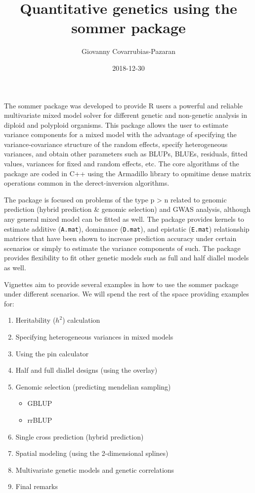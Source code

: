 \documentclass[]{article}
\title{Quantitative genetics using the sommer package}
\author{Giovanny Covarrubias-Pazaran}
\date{2018-12-30}
\providecommand{\tightlist}{%
  \setlength{\itemsep}{0pt}\setlength{\parskip}{0pt}}
\begin{document}
\maketitle

The sommer package was developed to provide R users a powerful and
reliable multivariate mixed model solver for different genetic and
non-genetic analysis in diploid and polyploid organisms. This package
allows the user to estimate variance components for a mixed model with
the advantage of specifying the variance-covariance structure of the
random effects, specify heterogeneous variances, and obtain other
parameters such as BLUPs, BLUEs, residuals, fitted values, variances for
fixed and random effects, etc. The core algorithms of the package are
coded in C++ using the Armadillo library to opmitime dense matrix
operations common in the derect-inversion algorithms.

The package is focused on problems of the type p \textgreater{} n
related to genomic prediction (hybrid prediction \& genomic selection)
and GWAS analysis, although any general mixed model can be fitted as
well. The package provides kernels to estimate additive
(\texttt{A.mat}), dominance (\texttt{D.mat}), and epistatic
(\texttt{E.mat}) relationship matrices that have been shown to increase
prediction accuracy under certain scenarios or simply to estimate the
variance components of such. The package provides flexibility to fit
other genetic models such as full and half diallel models as well.

Vignettes aim to provide several examples in how to use the sommer
package under different scenarios. We will spend the rest of the space
providing examples for:

\begin{enumerate}
\def\labelenumi{\arabic{enumi})}
\tightlist
\item
  Heritability (\(h^2\)) calculation
\item
  Specifying heterogeneous variances in mixed models
\item
  Using the pin calculator
\item
  Half and full diallel designs (using the overlay)
\item
  Genomic selection (predicting mendelian sampling)

  \begin{itemize}
  \tightlist
  \item
    GBLUP
  \item
    rrBLUP
  \end{itemize}
\item
  Single cross prediction (hybrid prediction)
\item
  Spatial modeling (using the 2-dimensional splines)
\item
  Multivariate genetic models and genetic correlations
\item
  Final remarks
\end{enumerate}
\end{document}

